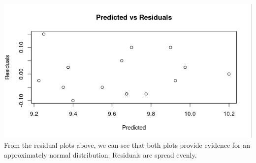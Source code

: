 \documentclass{article}
\begin{document}
\\\includegraphics{4.11cRes.PNG}
\\From the residual plots above, we can see that both plots provide evidence for an approximately normal distribution. Residuals are spread evenly.
\newpage
\end{document}
